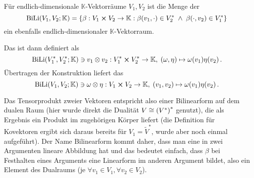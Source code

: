 \documentclass[../H_Analysis_main.tex]{subfiles}
\begin{document}
\begin{defi}\label{defi:tpkov}
Für endlich-dimensionale $\mathbb{K}$-Vektorräume $V_1, V_2$ ist die Menge der 
\begin{equation}
\text{BiLi}(V_1, V_2; \mathbb{K}) = \qty{\beta: V_1 \cross V_2 \rightarrow \mathbb{K}:  \beta(v_1, \cdot) \in V_2^* \; \wedge \; \beta(\cdot, v_2) \in V_1^*}
\end{equation}
ein ebenfalls endlich-dimensionaler $\mathbb{K}$-Vektorraum.

Das  ist dann definiert als
\begin{equation}
\text{BiLi}(V^*_1, V^*_2; \mathbb{K}) \ni v_1 \otimes v_2: V^*_1 \cross V^*_2 \rightarrow \mathbb{K}, \; (\omega, \eta) \mapsto \omega(v_1) \eta(v_2) \, .
\end{equation}
Übertragen der Konstruktion liefert das 
\begin{equation}
\text{BiLi}(V_1, V_2; \mathbb{K}) \ni \omega \otimes \eta: V_1 \cross V_2 \rightarrow \mathbb{K}, \; (v_1, v_2) \mapsto \omega(v_1) \eta(v_2) \, .
\end{equation}
\end{defi}

Das Tensorprodukt zweier Vektoren entspricht also einer Bilinearform auf dem dualen Raum (hier wurde direkt die Dualität $V \cong \qty(V^*)^*$ genutzt), die als Ergebnis ein Produkt im zugehörigen Körper liefert (die Definition für Kovektoren ergibt sich daraus bereits für $V_1 = \tilde{V}^*$, wurde aber noch einmal aufgeführt). Der Name Bilinearform kommt daher, dass man eine in zwei Argumenten lineare Abbildung hat und das bedeutet einfach, dass $\beta$ bei Festhalten eines Arguments eine Linearform im anderen Argument bildet, also ein Element des Dualraums (je $\forall v_1 \in V_1, \forall v_2 \in V_2$).
\end{document}
